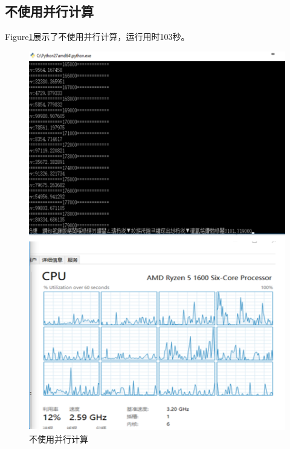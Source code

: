 \subsection{不使用并行计算}
Figure\ref{fig:sys.param}展示了不使用并行计算，运行用时103秒。
\begin{figure}[H]
\begin{center}
\includegraphics[width=16cm]{img//non_parallel.PNG}
\caption{不使用并行计算}
\label{fig:sys.param}
\end{center}
\end{figure}

